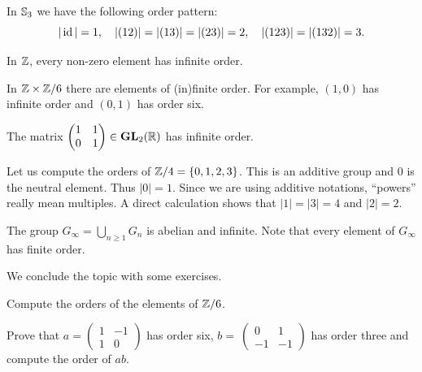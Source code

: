 \begin{example}
        In $\mathbb{S}_3$ we have the following order pattern:
        \[
        |\operatorname{id}|=1,\quad
        |(12)|=|(13)|=|(23)|=2,\quad
        |(123)|=|(132)|=3.
        \]
\end{example}
                        
\begin{example}
        In $\mathbb{Z}$, every non-zero element has 
        infinite order. 
\end{example}
                        
 \begin{example}
        In $\mathbb{Z}\times\mathbb{Z}/6$ there are elements of 
        (in)finite order. For example, $(1,0)$ 
        has infinite order and 
        $(0,1)$ has order six. 
 \end{example}
                        
\begin{example}
        The matrix $\begin{pmatrix}1&1\\0&1\end{pmatrix}\in\mathbf{GL}_2(\mathbb{R})$ has infinite order.
\end{example}                     

\begin{example}
    Let us compute the orders of $\mathbb{Z}/4=\{0,1,2,3\}$. This is an additive group and $0$ is the neutral element. 
    Thus $|0|=1$. Since we are using additive notations, ``powers'' really mean multiples. A direct calculation
    shows that $|1|=|3|=4$ and $|2|=2$. 
\end{example}
                                
\begin{example}
        The group $G_\infty=\bigcup_{n\geq1}G_n$ is abelian and infinite. Note that every element of 
        $G_\infty$ has finite order. 
\end{example}
          
We conclude the topic with some exercises. 

\begin{exercise}
\label{xca:orders_Z6}
        Compute the orders of the elements of $\mathbb{Z}/6$.
\end{exercise}       

\begin{exercise}
\label{xca:order_ab}
        Prove that $a=\begin{pmatrix}1&-1\\1&0\end{pmatrix}$ has order six, $b=\
        \begin{pmatrix}0&1\\-1&-1\end{pmatrix}$ has order three and 
        compute the order of $ab$.%
\end{exercise}


